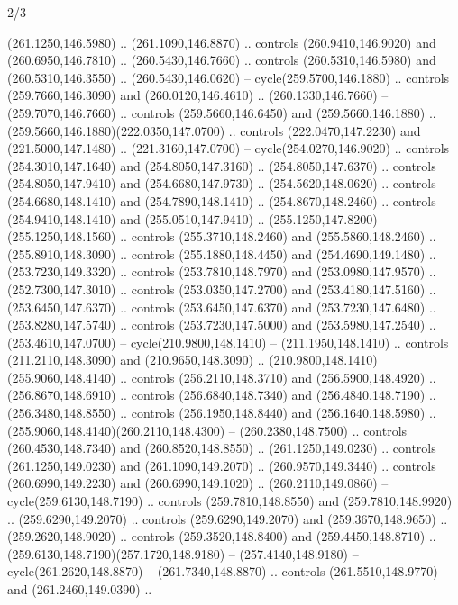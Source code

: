 \begin{flagdescription}{2/3}
\begin{scope}[xshift=0.5\flaglength,yshift=0.5\flagwidth,scale=\flagwidth/259.2]
\begin{scope}[y=0.8pt, x=0.8pt, yscale=-1,shift={(-243,-162)}]
      (261.1250,146.5980) .. (261.1090,146.8870) .. controls (260.9410,146.9020) and
      (260.6950,146.7810) .. (260.5430,146.7660) .. controls (260.5310,146.5980) and
      (260.5310,146.3550) .. (260.5430,146.0620) -- cycle(259.5700,146.1880) ..
      controls (259.7660,146.3090) and (260.0120,146.4610) .. (260.1330,146.7660) --
      (259.7070,146.7660) .. controls (259.5660,146.6450) and (259.5660,146.1880) ..
      (259.5660,146.1880)(222.0350,147.0700) .. controls (222.0470,147.2230) and
      (221.5000,147.1480) .. (221.3160,147.0700) -- cycle(254.0270,146.9020) ..
      controls (254.3010,147.1640) and (254.8050,147.3160) .. (254.8050,147.6370) ..
      controls (254.8050,147.9410) and (254.6680,147.9730) .. (254.5620,148.0620) ..
      controls (254.6680,148.1410) and (254.7890,148.1410) .. (254.8670,148.2460) ..
      controls (254.9410,148.1410) and (255.0510,147.9410) .. (255.1250,147.8200) --
      (255.1250,148.1560) .. controls (255.3710,148.2460) and (255.5860,148.2460) ..
      (255.8910,148.3090) .. controls (255.1880,148.4450) and (254.4690,149.1480) ..
      (253.7230,149.3320) .. controls (253.7810,148.7970) and (253.0980,147.9570) ..
      (252.7300,147.3010) .. controls (253.0350,147.2700) and (253.4180,147.5160) ..
      (253.6450,147.6370) .. controls (253.6450,147.6370) and (253.7230,147.6480) ..
      (253.8280,147.5740) .. controls (253.7230,147.5000) and (253.5980,147.2540) ..
      (253.4610,147.0700) -- cycle(210.9800,148.1410) -- (211.1950,148.1410) ..
      controls (211.2110,148.3090) and (210.9650,148.3090) ..
      (210.9800,148.1410)(255.9060,148.4140) .. controls (256.2110,148.3710) and
      (256.5900,148.4920) .. (256.8670,148.6910) .. controls (256.6840,148.7340) and
      (256.4840,148.7190) .. (256.3480,148.8550) .. controls (256.1950,148.8440) and
      (256.1640,148.5980) .. (255.9060,148.4140)(260.2110,148.4300) --
      (260.2380,148.7500) .. controls (260.4530,148.7340) and (260.8520,148.8550) ..
      (261.1250,149.0230) .. controls (261.1250,149.0230) and (261.1090,149.2070) ..
      (260.9570,149.3440) .. controls (260.6990,149.2230) and (260.6990,149.1020) ..
      (260.2110,149.0860) -- cycle(259.6130,148.7190) .. controls
      (259.7810,148.8550) and (259.7810,148.9920) .. (259.6290,149.2070) .. controls
      (259.6290,149.2070) and (259.3670,148.9650) .. (259.2620,148.9020) .. controls
      (259.3520,148.8400) and (259.4450,148.8710) ..
      (259.6130,148.7190)(257.1720,148.9180) -- (257.4140,148.9180) --
      cycle(261.2620,148.8870) -- (261.7340,148.8870) .. controls
      (261.5510,148.9770) and (261.2460,149.0390) ..

\end{scope}
\end{scope}
\end{flagdescription}
